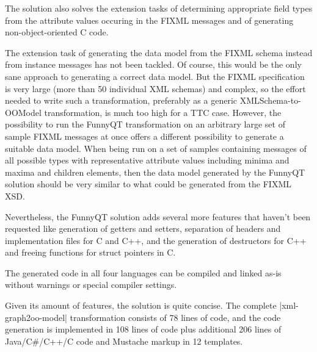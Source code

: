 \documentclass[submission]{eptcs}
\newcommand{\code}{\clojureinline}
\begin{document}
The solution also solves the extension tasks of determining appropriate field
types from the attribute values occuring in the FIXML messages and of
generating non-object-oriented C code.

The extension task of generating the data model from the FIXML schema instead
from instance messages has not been tackled.  Of course, this would be the only
sane approach to generating a correct data model.  But the FIXML specification
is very large (more than 50 individual XML schemas) and complex, so the effort
needed to write such a transformation, preferably as a generic
XMLSchema-to-OOModel transformation, is much too high for a TTC case.  However,
the possibility to run the FunnyQT transformation on an arbitrary large set of
sample FIXML messages at once offers a different possibility to generate a
suitable data model.  When being run on a set of samples containing messages of
all possible types with representative attribute values including minima and
maxima and children elements, then the data model generated by the FunnyQT
solution should be very similar to what could be generated from the FIXML XSD.

Nevertheless, the FunnyQT solution adds several more features that haven't been
requested like generation of getters and setters, separation of headers and
implementation files for C and C++, and the generation of destructors for C++
and freeing functions for struct pointers in C.

The generated code in all four languages can be compiled and linked as-is
without warnings or special compiler settings.

Given its amount of features, the solution is quite concise.  The complete
\code|xml-graph2oo-model| transformation consists of 78 lines of code, and the
code generation is implemented in 108 lines of code plus additional 206 lines
of Java/C\#/C++/C code and Mustache markup in 12 templates.









\end{document}
